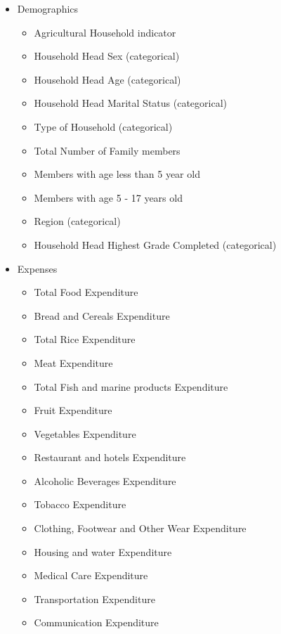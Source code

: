 \documentclass{article}
\begin{document}
\begin{itemize}
  \item Demographics
    \begin{multicols}{2}
      \begin{itemize}
        \item Agricultural Household indicator
        \item Household Head Sex (categorical)
        \item Household Head Age (categorical)
        \item Household Head Marital Status (categorical)
        \item Type of Household (categorical)
        \item Total Number of Family members
        \item Members with age less than 5 year old
        \item Members with age 5 - 17 years old
        \item Region (categorical)
        \item Household Head Highest Grade Completed (categorical)
      \end{itemize}
    \end{multicols}
  \item Expenses
    \begin{multicols}{2}
      \begin{itemize}
        \item Total Food Expenditure
        \item Bread and Cereals Expenditure
        \item Total Rice Expenditure
        \item Meat Expenditure
        \item Total Fish and marine products Expenditure
        \item Fruit Expenditure
        \item Vegetables Expenditure
        \item Restaurant and hotels Expenditure
        \item Alcoholic Beverages Expenditure
        \item Tobacco Expenditure
        \item Clothing, Footwear and Other Wear Expenditure
        \item Housing and water Expenditure
        \item Medical Care Expenditure
        \item Transportation Expenditure
        \item Communication Expenditure

\end{itemize}
\end{multicols}
\end{itemize}
\end{document}
